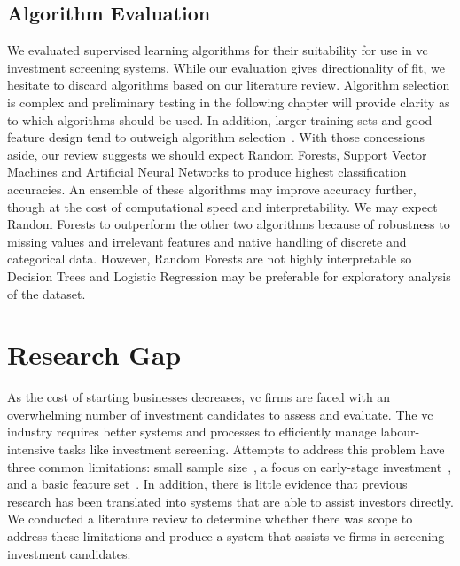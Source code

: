 \documentclass[../thesis/thesis.tex]{subfiles}
\begin{document}
\subsection{Algorithm Evaluation}

We evaluated supervised learning algorithms for their suitability for use in \gls{vc} investment screening systems. While our evaluation gives directionality of fit, we hesitate to discard algorithms based on our literature review. Algorithm selection is complex and preliminary testing in the following chapter will provide clarity as to which algorithms should be used. In addition, larger training sets and good feature design tend to outweigh algorithm selection~\cite{caruana2008}. With those concessions aside, our review suggests we should expect Random Forests, Support Vector Machines and Artificial Neural Networks to produce highest classification accuracies. An ensemble of these algorithms may improve accuracy further, though at the cost of computational speed and interpretability. We may expect Random Forests to outperform the other two algorithms because of robustness to missing values and irrelevant features and native handling of discrete and categorical data. However, Random Forests are not highly interpretable so Decision Trees and Logistic Regression may be preferable for exploratory analysis of the dataset.

\section{Research Gap}

As the cost of starting businesses decreases, \gls{vc} firms are faced with an overwhelming number of investment candidates to assess and evaluate. The \gls{vc} industry requires better systems and processes to efficiently manage labour-intensive tasks like investment screening. Attempts to address this problem have three common limitations: small sample size~\cite{ahlers2015, gimmon2010, hoenen2014, yu2015, an2015, werth2013, croce2016}, a focus on early-stage investment~\cite{beckwith2016, ahlers2015, cheng2016, yuan2016, croce2016, stone2014}, and a basic feature set~\cite{ahlers2015, an2015, cheng2016, croce2016, werth2013, gimmon2010}. In addition, there is little evidence that previous research has been translated into systems that are able to assist investors directly. We conducted a literature review to determine whether there was scope to address these limitations and produce a system that assists \gls{vc} firms in screening investment candidates.
\end{document}

